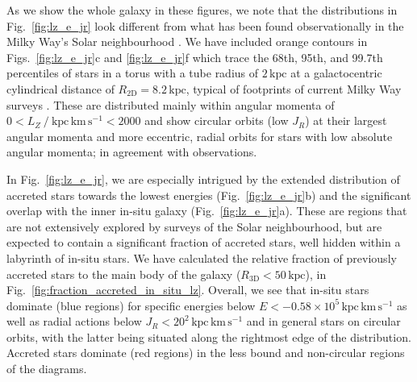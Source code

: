 \documentclass[fleqn,usenatbib]{mnras}
\newcommand{\changed}[1]{{{#1}}}
\begin{document}
As we show the whole galaxy in these figures, we note that the distributions in Fig.~\ref{fig:lz_e_jr} look different from what has been found observationally in the Milky Way's Solar neighbourhood \citep[see for example][]{Helmi2018,Trick2019,Das2020,Buder2022}. We have included orange contours in Figs.~\ref{fig:lz_e_jr}c and \ref{fig:lz_e_jr}f which trace the 68th, 95th, and 99.7th percentiles of stars in a torus with a tube radius of $2\,\mathrm{kpc}$ at a galactocentric cylindrical distance of $R_\mathrm{2D} = 8.2\,\mathrm{kpc}$, typical of footprints of current Milky Way surveys \citep[for example][]{SDSSDR17, Katz2023, Buder2025}. These are distributed mainly within angular momenta of $0 < L_Z~/~\mathrm{kpc\,km\,s^{-1}} < 2000$ and show circular orbits (low $J_R$) at their largest angular momenta and more eccentric, radial orbits for stars with low absolute angular momenta; in agreement with observations.

In Fig.~\ref{fig:lz_e_jr}, we are especially intrigued by the extended distribution of accreted stars towards the lowest energies (Fig.~\ref{fig:lz_e_jr}b) and the significant overlap with the inner in-situ galaxy (Fig.~\ref{fig:lz_e_jr}a). These are regions that are not extensively explored by surveys of the Solar neighbourhood, but are expected to contain a significant fraction of accreted stars, well hidden within a labyrinth of in-situ stars. We have calculated the relative fraction of previously accreted stars to the main body of the galaxy ($R_\mathrm{3D} < 50\,\mathrm{kpc}$), in Fig.~\ref{fig:fraction_accreted_in_situ_lz}. Overall, we see that in-situ stars dominate (blue regions) for specific energies below $E < -0.58\times10^{5}\,\mathrm{kpc\,km\,s^{-1}}$ as well as radial actions below $J_R < 20^2\,\mathrm{kpc\,km\,s^{-1}}$ and in general stars on circular orbits, with the latter being situated along the \changed{rightmost} edge of the distribution. Accreted stars dominate (red regions) in the less bound and non-circular regions of the diagrams.
\end{document}
